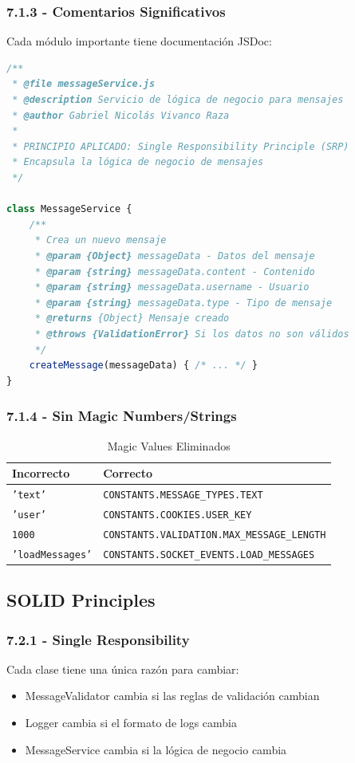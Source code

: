 \documentclass[12pt,a4paper]{article}
\begin{document}
\subsubsection{7.1.3 - Comentarios Significativos}
Cada módulo importante tiene documentación JSDoc:

\begin{lstlisting}[language=JavaScript]
/**
 * @file messageService.js
 * @description Servicio de lógica de negocio para mensajes
 * @author Gabriel Nicolás Vivanco Raza
 * 
 * PRINCIPIO APLICADO: Single Responsibility Principle (SRP)
 * Encapsula la lógica de negocio de mensajes
 */

class MessageService {
    /**
     * Crea un nuevo mensaje
     * @param {Object} messageData - Datos del mensaje
     * @param {string} messageData.content - Contenido
     * @param {string} messageData.username - Usuario
     * @param {string} messageData.type - Tipo de mensaje
     * @returns {Object} Mensaje creado
     * @throws {ValidationError} Si los datos no son válidos
     */
    createMessage(messageData) { /* ... */ }
}
\end{lstlisting}

\subsubsection{7.1.4 - Sin Magic Numbers/Strings}
\begin{table}[h]
\centering
\caption{Magic Values Eliminados}
\begin{tabular}{|l|l|}
\hline
\textbf{Incorrecto} & \textbf{Correcto} \\
\hline
\texttt{'text'} & \texttt{CONSTANTS.MESSAGE\_TYPES.TEXT} \\
\texttt{'user'} & \texttt{CONSTANTS.COOKIES.USER\_KEY} \\
\texttt{1000} & \texttt{CONSTANTS.VALIDATION.MAX\_MESSAGE\_LENGTH} \\
\texttt{'loadMessages'} & \texttt{CONSTANTS.SOCKET\_EVENTS.LOAD\_MESSAGES} \\
\hline
\end{tabular}
\end{table}

\subsection{SOLID Principles}

\subsubsection{7.2.1 - Single Responsibility}
Cada clase tiene una única razón para cambiar:
\begin{itemize}
    \item MessageValidator cambia si las reglas de validación cambian
    \item Logger cambia si el formato de logs cambia
    \item MessageService cambia si la lógica de negocio cambia
\end{itemize}
\end{document}

